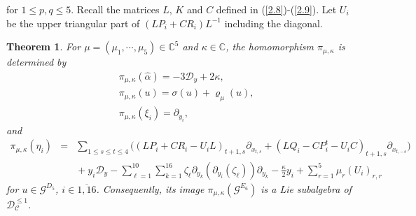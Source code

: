 \documentclass[12pt]{article}
\numberwithin{equation}{section}
\newtheorem{theorem}{Theorem}[section]
\theoremstyle{definition}
\theoremstyle{remark}
\begin{document}
for $1\leqslant p,q\leqslant 5$. Recall the matrices $L$, $K$ and $C$ defined in (\ref{2.8})-(\ref{2.9}). Let $U_i$ be the upper triangular part of $(LP_i+CR_i)L^{-1}$ including the diagonal. 
\begin{theorem}\label{thm3.1}
	For $\mu=(\mu_1,\cdots,\mu_5)\in\mathbb{C}^5$ and $\kappa\in\mathbb{C}$, the homomorphism $\pi_{\mu,\kappa}$ is determined by 
	\begin{eqnarray}
		&\pi_{\mu,\kappa}(\widehat{\alpha})=-3\mathcal{D}_y+2\kappa,\label{r1}\\
		&\pi_{\mu,\kappa}(u)=\sigma(u)+\varrho_{\mu}(u),\label{r2}\\
		&\pi_{\mu,\kappa}(\xi_i)=\partial_{y_i},\label{r3}
	\end{eqnarray}
	and
	\begin{eqnarray}
		\!\!\!\!\pi_{\mu,\kappa}(\eta_i)\!\!&\!\!=\!\!&\!\!
		\sum\limits_{1\leqslant s\leqslant t\leqslant 4}\big((LP_i+CR_i-U_iL)_{t+1,s}\partial_{x_{t,s}}+(LQ_i-CP_i^t-U_iC)_{t+1,s}\partial_{x_{t,-s}}\big)  \nonumber\\
		\!\!&\!\!\!\!&\!\!+y_i\mathcal{D}_y-\sum_{\ell=1}^{10}\sum\limits_{k=1}^{16}\zeta_{\ell}\partial_{y_k}(\partial_{y_i}(\zeta_{\ell}))\partial_{y_k}\!-\!\frac{\kappa}{2}y_i+\!\sum_{r=1}^5\!\mu_r(U_i)_{r,r} 	 \label{r4}	
	\end{eqnarray}
	for $u\in\mathscr{G}^{D_5}$, $i\in\overline{1,16}$. Consequently, its image $\pi_{\mu,\kappa}(\mathscr{G}^{E_6})$ is a Lie subalgebra of $\mathscr{D}_{\mathscr{C}}^{\leqslant 1}$.
\end{theorem}
\end{document}

